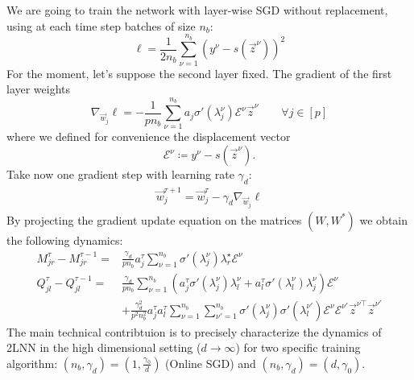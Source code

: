 \documentclass{article}
\theoremstyle{plain}
\theoremstyle{definition}
\theoremstyle{remark}
\begin{document}
We are going to train the network with layer-wise SGD without replacement, using at each time step batches of size $n_b$: 
\[
    \ell = \frac{1}{2n_b} \sum_{\nu=1}^{n_b}(y^\nu - s(\vec z^\nu))^2
\]
For the moment, let's suppose the second layer fixed. The gradient of the first layer weights
\[
    \nabla_{\vec w_j} \ell = -\frac{1}{pn_b} \sum_{\nu=1}^{n_b} a_j \sigma'(\lambda^\nu_j)\mathcal{E}^\nu \vec{z}^\nu \qquad \forall j \in [p]
\]
where we defined for convenience the displacement vector 
\begin{equation}
\mathcal{E}^{\nu} \coloneqq y^\nu-s{(\vec z^\nu)}.
\end{equation}
Take now one gradient step with learning rate $\gamma_d$:
\begin{align}
    \vec w_j^{\tau + 1} = \vec w_j^\tau - \gamma_d  \nabla_{\vec w_j} \ell
    \label{eq:gd_update_weight}
 \end{align}
By projecting the gradient update equation on the matrices $(W,W^*)$ we obtain the following dynamics:
\begin{equation}
\begin{aligned}
M^{\tau}_{jr} - M^{\tau - 1}_{jr} =&  \frac{\gamma_d}{pn_b} a_j^{\tau} \sum_{\nu = 1}^{n_b} \sigma'(\lambda_j^\nu)\lambda^{\star}_{r} \mathcal{E}^{\nu} \\
Q_{jl}^{\tau} - Q^{\tau -1 }_{jl} =& \frac{\gamma_d}{pn_b} \sum_{\nu = 1}^{n_b} \left(a_j^{\tau}\sigma'(\lambda_j^\nu)\lambda^{\nu}_{l}+a_l^{\tau}\sigma'(\lambda_l^\nu)\lambda^{\nu}_{j}\right) \mathcal{E}^\nu \\
    &+\frac{\gamma_d^2}{p^2n_b^2}a_j^{\tau}a_l^{\tau}\sum_{\nu = 1}^{n_b} \sum_{\nu' = 1}^{n_b} \sigma'(\lambda_j^\nu)\sigma'(\lambda_l^{\nu'})\mathcal{E}^\nu\mathcal{E}^{\nu'} \vec z^{\nu\top} \vec z^{\nu'}
\label{eq:overlap_training}
\end{aligned}
\end{equation}
The main technical contribtuion is to precisely characterize the dynamics of 2LNN in the high dimensional setting ($d \to \infty$) for two specific training algorithm: ${(n_b, \gamma_d) = (1,\frac {\gamma_0}{d})}$ (Online SGD) and $(n_b, \gamma_d) = (d,\gamma_0)$.
\end{document}
